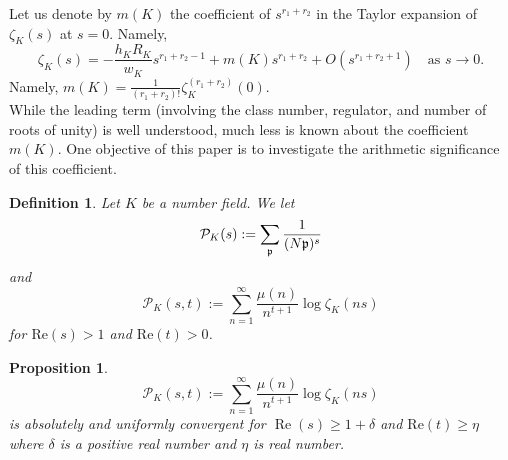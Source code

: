 \documentclass[12pt]{amsart}
\newtheorem{proposition}[theorem]{Proposition}
\newtheorem{definition}[theorem]{Definition}%
\begin{document}
Let us denote by $m(K)$ the coefficient of $s^{r_1 + r_2}$ in the Taylor expansion of $\zeta_K(s)$ at $s = 0$. Namely,
\[
\zeta_K(s) = -\frac{h_K R_K}{w_K} s^{r_1 + r_2 - 1} + m(K) s^{r_1 + r_2} + O(s^{r_1 + r_2 + 1}) \quad \text{as } s \to 0.
\]
Namely, $m(K)=\frac{1}{(r_1+r_2)!}\zeta_K^{(r_1+r_2)}(0)$.\\


While the leading term (involving the class number, regulator, and number of roots of unity) is well understood, much less is known about the coefficient $m(K)$. One objective of this paper is to investigate the  {arithmetic}  significance of this coefficient.



\begin{definition} Let $K$ be a number field.
We let
\[
\mathcal{P}_K(s):=\sum_{\frak p } \frac{1}{(N \frak p)^s}
\]
and
\[
\mathcal{P}_K(s,t):=
\sum_{n=1}^\infty \frac{\mu(n)}{n^{t+1}}\log \zeta_K(ns)
\]
for $\mathrm{Re}(s)>1$ and $ \mathrm{Re}(t)>0$.
\end{definition}


\begin{proposition}\label{AbsConv}
\begin{equation}\label{defPK}
\mathcal{P}_K(s,t):=
\sum_{n=1}^\infty \frac{\mu(n)}{n^{t+1}}\log \zeta_K(ns)
\end{equation}
is absolutely and uniformly convergent for $\operatorname{Re}(s) \geq 1 + \delta$ and 
$\mathrm{Re}(t)\geq \eta$ where $\delta$ is a positive real number and 
$\eta$ is real number. 

\end{proposition} 
\end{document}
